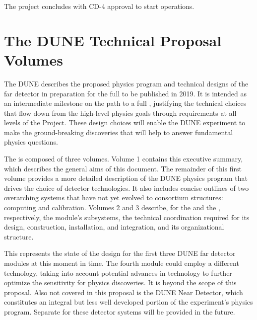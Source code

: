 The project concludes with CD-4 approval to start operations.


\section{The DUNE Technical Proposal Volumes}


The DUNE  describes the proposed physics program and 
technical designs of the far detector in preparation for the full  
to be published in 2019.  
It is intended as an intermediate
milestone on the path to a full , justifying the technical choices that flow down from the high-level physics goals through requirements at all levels of the Project. These design choices will enable the DUNE experiment to make the ground-breaking discoveries that will help to  answer %
fundamental physics questions.

The   is composed of three volumes. Volume 1 contains this executive summary, which describes 
the general aims of this document. The remainder of this first volume provides a more detailed description of the DUNE physics program that drives the choice of detector technologies. It also includes concise outlines of two overarching systems that have not yet evolved to consortium structures:  computing and calibration. 
Volumes 2  and 3 describe, for the  and the , respectively, the module's subsystems, the technical coordination required for its design, construction, installation, and integration, and its organizational structure.



This   represents the state of the design for the first three DUNE far detector modules at this moment
in time. The fourth module could employ a different \lartpc technology, taking into account  potential advances in technology to further optimize the sensitivity for physics discoveries. It is beyond the scope of this proposal. Also not covered in this proposal is the DUNE Near Detector, which constitutes an integral but less well developed portion of the experiment's  physics program. Separate   for these detector systems will be
provided in the future.

